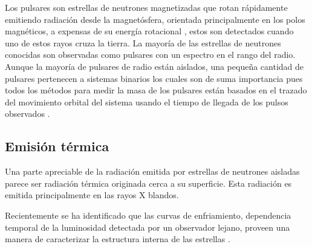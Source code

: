 Los pulsares son estrellas de neutrones magnetizadas que rotan rápidamente emitiendo radiación desde la magnetósfera, orientada principalmente en los polos magnéticos, a expensas de su energía rotacional \cite{Becker2009}, estos son detectados cuando uno de estos rayos cruza la tierra. La mayoría de las estrellas de neutrones conocidas son observadas como pulsares con un espectro en el rango del radio. Aunque la mayoría de pulsares de radio están aislados, una pequeña cantidad de pulsares pertenecen a sistemas binarios los cuales son de suma importancia pues todos los métodos para medir la masa de los pulsares están basados en el trazado del movimiento orbital del sistema usando el tiempo de llegada de los pulsos observados \cite{Ozel2016}.


\subsection{Emisión térmica}

Una parte apreciable de la radiación emitida por estrellas de neutrones aisladas parece ser radiación térmica originada cerca a su superficie. Esta radiación es emitida principalmente en las rayos X blandos.


Recientemente se ha identificado que las curvas de enfriamiento, dependencia temporal de la luminosidad detectada por un observador lejano, proveen una manera de caracterizar la estructura interna de las estrellas \cite{Yakovlev2004}.

